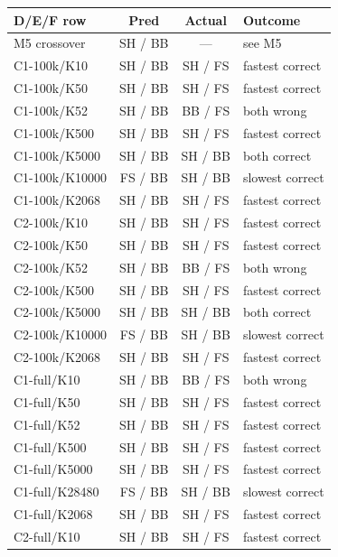 \documentclass[10pt,a4paper]{article}
\begin{document}
\hfill
\begin{minipage}[t]{0.485\linewidth}\vspace{0pt}
{\fontsize{8.6}{10.4}\selectfont
\renewcommand{\arraystretch}{1.28}
\begin{tabularx}{\linewidth}{@{}L{1.25}C{0.8}C{0.85}L{1.1}@{}}
\toprule{}
\textbf{D/E/F row} & \textbf{Pred} & \textbf{Actual} & \textbf{Outcome} \\
\midrule
M5 crossover & SH / BB & --- & see M5 \\
C1-100k/K10 & SH / BB & SH / FS & fastest correct \\
C1-100k/K50 & SH / BB & SH / FS & fastest correct \\
C1-100k/K52 & SH / BB & BB / FS & both wrong \\
C1-100k/K500 & SH / BB & SH / FS & fastest correct \\
C1-100k/K5000 & SH / BB & SH / BB & both correct \\
C1-100k/K10000 & FS / BB & SH / BB & slowest correct \\
C1-100k/K2068 & SH / BB & SH / FS & fastest correct \\
C2-100k/K10 & SH / BB & SH / FS & fastest correct \\
C2-100k/K50 & SH / BB & SH / FS & fastest correct \\
C2-100k/K52 & SH / BB & BB / FS & both wrong \\
C2-100k/K500 & SH / BB & SH / FS & fastest correct \\
C2-100k/K5000 & SH / BB & SH / BB & both correct \\
C2-100k/K10000 & FS / BB & SH / BB & slowest correct \\
C2-100k/K2068 & SH / BB & SH / FS & fastest correct \\
C1-full/K10 & SH / BB & BB / FS & both wrong \\
C1-full/K50 & SH / BB & SH / FS & fastest correct \\
C1-full/K52 & SH / BB & SH / FS & fastest correct \\
C1-full/K500 & SH / BB & SH / FS & fastest correct \\
C1-full/K5000 & SH / BB & SH / FS & fastest correct \\
C1-full/K28480 & FS / BB & SH / BB & slowest correct \\
C1-full/K2068 & SH / BB & SH / FS & fastest correct \\
C2-full/K10 & SH / BB & SH / FS & fastest correct \\

\end{tabularx}}
\end{minipage}
\end{document}
